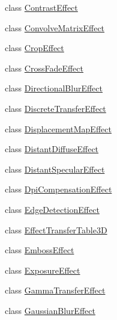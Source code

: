 \begin{DoxyCompactItemize}
\item 
class \hyperlink{class_microsoft_1_1_graphics_1_1_canvas_1_1_effects_1_1_contrast_effect}{Contrast\+Effect}
\item 
class \hyperlink{class_microsoft_1_1_graphics_1_1_canvas_1_1_effects_1_1_convolve_matrix_effect}{Convolve\+Matrix\+Effect}
\item 
class \hyperlink{class_microsoft_1_1_graphics_1_1_canvas_1_1_effects_1_1_crop_effect}{Crop\+Effect}
\item 
class \hyperlink{class_microsoft_1_1_graphics_1_1_canvas_1_1_effects_1_1_cross_fade_effect}{Cross\+Fade\+Effect}
\item 
class \hyperlink{class_microsoft_1_1_graphics_1_1_canvas_1_1_effects_1_1_directional_blur_effect}{Directional\+Blur\+Effect}
\item 
class \hyperlink{class_microsoft_1_1_graphics_1_1_canvas_1_1_effects_1_1_discrete_transfer_effect}{Discrete\+Transfer\+Effect}
\item 
class \hyperlink{class_microsoft_1_1_graphics_1_1_canvas_1_1_effects_1_1_displacement_map_effect}{Displacement\+Map\+Effect}
\item 
class \hyperlink{class_microsoft_1_1_graphics_1_1_canvas_1_1_effects_1_1_distant_diffuse_effect}{Distant\+Diffuse\+Effect}
\item 
class \hyperlink{class_microsoft_1_1_graphics_1_1_canvas_1_1_effects_1_1_distant_specular_effect}{Distant\+Specular\+Effect}
\item 
class \hyperlink{class_microsoft_1_1_graphics_1_1_canvas_1_1_effects_1_1_dpi_compensation_effect}{Dpi\+Compensation\+Effect}
\item 
class \hyperlink{class_microsoft_1_1_graphics_1_1_canvas_1_1_effects_1_1_edge_detection_effect}{Edge\+Detection\+Effect}
\item 
class \hyperlink{class_microsoft_1_1_graphics_1_1_canvas_1_1_effects_1_1_effect_transfer_table3_d}{Effect\+Transfer\+Table3D}
\item 
class \hyperlink{class_microsoft_1_1_graphics_1_1_canvas_1_1_effects_1_1_emboss_effect}{Emboss\+Effect}
\item 
class \hyperlink{class_microsoft_1_1_graphics_1_1_canvas_1_1_effects_1_1_exposure_effect}{Exposure\+Effect}
\item 
class \hyperlink{class_microsoft_1_1_graphics_1_1_canvas_1_1_effects_1_1_gamma_transfer_effect}{Gamma\+Transfer\+Effect}
\item 
class \hyperlink{class_microsoft_1_1_graphics_1_1_canvas_1_1_effects_1_1_gaussian_blur_effect}{Gaussian\+Blur\+Effect}

\end{DoxyCompactItemize}
